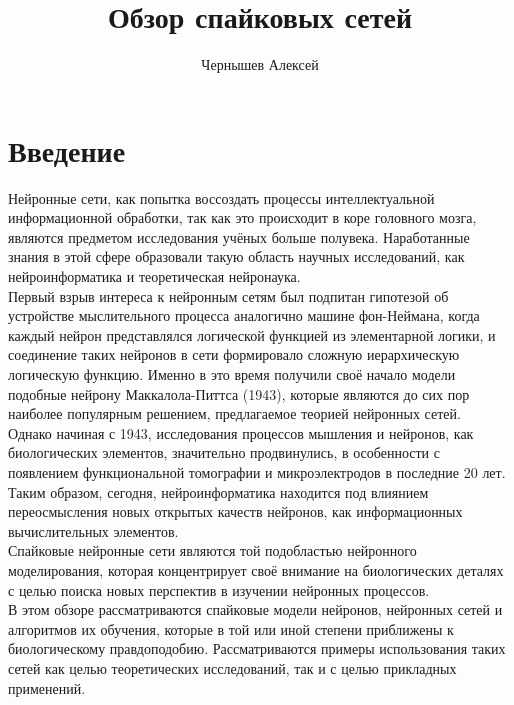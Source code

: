 \documentclass[a4paper,10pt]{article}
\title{Обзор спайковых сетей}
\author{Чернышев Алексей}
\begin{document}


\tableofcontents
\clearpage
\section{Введение}
\indent Нейронные сети, как попытка воссоздать процессы интеллектуальной информационной обработки, так как это происходит в коре головного мозга, являются предметом исследования учёных больше полувека. Наработанные знания в этой сфере образовали такую область научных исследований, как нейроинформатика и теоретическая нейронаука.\\
\indent Первый взрыв интереса к нейронным сетям был подпитан гипотезой об устройстве мыслительного процесса аналогично машине фон-Неймана, когда каждый нейрон представлялся логической функцией из элементарной логики, и соединение таких нейронов в сети формировало сложную иерархическую логическую функцию. Именно в это время получили своё начало модели подобные нейрону Маккалола-Питтса (1943), которые являются до сих пор наиболее популярным решением, предлагаемое теорией нейронных сетей.\\
\indent Однако начиная с 1943, исследования процессов мышления и нейронов, как биологических элементов, значительно продвинулись, в особенности с появлением функциональной томографии и микроэлектродов в последние 20 лет. Таким образом, сегодня, нейроинформатика находится под влиянием переосмысления новых открытых качеств нейронов\cite{BohteReview}, как информационных вычислительных элементов.\\
\indent Спайковые нейронные сети являются той подобластью нейронного моделирования, которая концентрирует своё внимание на биологических деталях с целью поиска новых перспектив в изучении нейронных процессов.\\
\indent В этом обзоре рассматриваются спайковые модели нейронов, нейронных сетей и алгоритмов их обучения, которые в той или иной степени приближены к биологическому правдоподобию. Рассматриваются примеры использования таких сетей как целью теоретических исследований, так и с целью прикладных применений.\\
\end{document}
